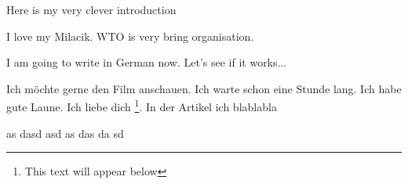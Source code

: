 
Here is my very clever introduction

I love my Milacik.
WTO is very bring organisation.

I am going to write in German now.
Let's see if it works...

Ich möchte gerne den Film anschauen. Ich warte schon eine Stunde lang.
Ich habe gute Laune. Ich liebe dich \footnote{This text will appear below}.
In der Artikel \cite{lipkova_vstup_ruska_do_wto} ich blablabla

as
dasd
asd
as
das
da
sd 